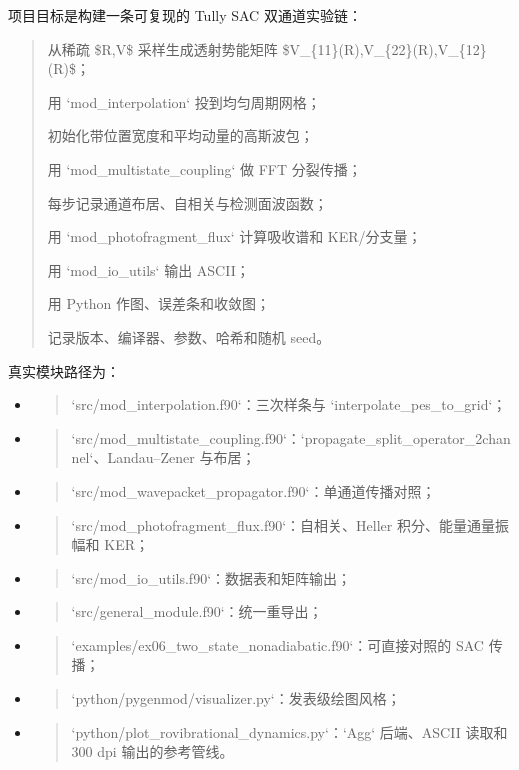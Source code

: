 \documentclass[UTF8,openany,11pt,fontset=fandol]{ctexbook}
\begin{document}
项目目标是构建一条可复现的 Tully SAC 双通道实验链：

\begin{quote}
从稀疏 \$R,V\$ 采样生成透射势能矩阵
\$V\_\{11\}(R),V\_\{22\}(R),V\_\{12\}(R)\$；

用 `mod\_interpolation` 投到均匀周期网格；

初始化带位置宽度和平均动量的高斯波包；

用 `mod\_multistate\_coupling` 做 FFT 分裂传播；

每步记录通道布居、自相关与检测面波函数；

用 `mod\_photofragment\_flux` 计算吸收谱和 KER/分支量；

用 `mod\_io\_utils` 输出 ASCII；

用 Python 作图、误差条和收敛图；

记录版本、编译器、参数、哈希和随机 seed。
\end{quote}

真实模块路径为：

\begin{itemize}
\item
  \begin{quote}
  `src/mod\_interpolation.f90`：三次样条与
  `interpolate\_pes\_to\_grid`；
  \end{quote}
\item
  \begin{quote}
  `src/mod\_multistate\_coupling.f90`：`propagate\_split\_operator\_2channel`、Landau--Zener
  与布居；
  \end{quote}
\item
  \begin{quote}
  `src/mod\_wavepacket\_propagator.f90`：单通道传播对照；
  \end{quote}
\item
  \begin{quote}
  `src/mod\_photofragment\_flux.f90`：自相关、Heller
  积分、能量通量振幅和 KER；
  \end{quote}
\item
  \begin{quote}
  `src/mod\_io\_utils.f90`：数据表和矩阵输出；
  \end{quote}
\item
  \begin{quote}
  `src/general\_module.f90`：统一重导出；
  \end{quote}
\item
  \begin{quote}
  `examples/ex06\_two\_state\_nonadiabatic.f90`：可直接对照的 SAC 传播；
  \end{quote}
\item
  \begin{quote}
  `python/pygenmod/visualizer.py`：发表级绘图风格；
  \end{quote}
\item
  \begin{quote}
  `python/plot\_rovibrational\_dynamics.py`：`Agg` 后端、ASCII 读取和
  300 dpi 输出的参考管线。
  \end{quote}
\end{itemize}
\end{document}
